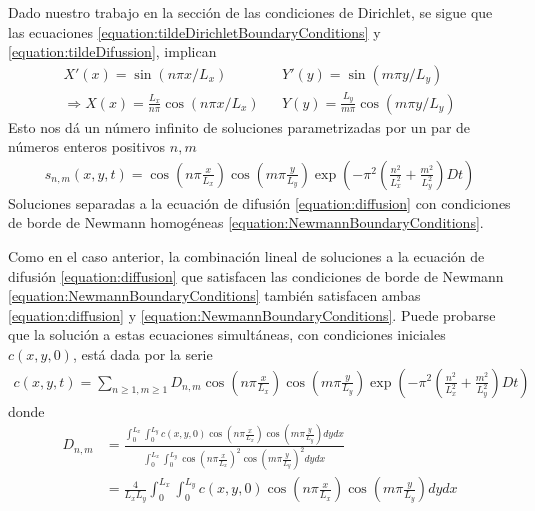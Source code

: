 \documentclass{article}
\begin{document}
  Dado nuestro trabajo en la sección de las condiciones de Dirichlet, se sigue que las ecuaciones \eqref{equation:tildeDirichletBoundaryConditions} y \eqref{equation:tildeDifussion}, implican
  \begin{align}
    X'(x) = \sin(n \pi x / L_x)
    &&Y'(y) = \sin(m \pi y / L_y)
    \\
    \Rightarrow
    X(x) = \frac{L_x}{n \pi} \cos(n \pi x / L_x)
    && Y(y) = \frac{L_y}{m \pi} \cos(m \pi y / L_y)
  \end{align}
  Esto nos dá un número infinito de soluciones parametrizadas por un par de números enteros positivos \(n, m\)
  \begin{align}
    s_{n, m}(x, y, t)
    =
    \cos\left( n \pi \frac{x}{L_x} \right) \cos\left(m \pi \frac{y}{L_y} \right) \exp\left( - \pi^2 \left( \frac{n^2}{L_x^2} + \frac{m^2}{L_y^2} \right) D t \right)
  \end{align}
  Soluciones separadas a la ecuación de difusión \eqref{equation:diffusion} con condiciones de borde de Newmann homogéneas \eqref{equation:NewmannBoundaryConditions}.


  Como en el caso anterior, la combinación lineal de soluciones a la ecuación de difusión \eqref{equation:diffusion} que satisfacen las condiciones de borde de Newmann \eqref{equation:NewmannBoundaryConditions} también satisfacen ambas \eqref{equation:diffusion} y \eqref{equation:NewmannBoundaryConditions}.
  Puede probarse que la solución a estas ecuaciones simultáneas, con condiciones iniciales \(c(x, y, 0)\), está dada por la serie
  \begin{align}
    c(x, y, t)
    =
    \sum_{n \geq 1, m \geq 1}
      D_{n, m}
      \cos\left( n \pi \frac{x}{L_x} \right)
      \cos\left( m \pi \frac{y}{L_y} \right)
      \exp\left(
        - \pi^2 \left(
          \frac{n^2}{L_x^2} + \frac{m^2}{L_y^2}
        \right)
        D t
      \right)
  \end{align}
  donde
  \begin{align}
    D_{n, m}
    &=
    \frac{
      \int_0^{L_x}
        \int_0^{L_y}
          c(x, y, 0)
          \cos\left( n \pi \frac{x}{L_x} \right)
          \cos\left( m \pi \frac{y}{L_y} \right)
        d y
      d x
    }{
      \int_0^{L_x}
        \int_0^{L_y}
        \cos\left( n \pi \frac{x}{L_x} \right)^2
        \cos\left( m \pi \frac{y}{L_y} \right)^2
        d y
      d x
    }
    \\
    &=
    \frac{4}{L_x L_y} 
    \int_0^{L_x}
      \int_0^{L_y}
        c(x, y, 0)
        \cos\left( n \pi \frac{x}{L_x} \right)
        \cos\left( m \pi \frac{y}{L_y} \right)
      d y
    d x
  \end{align}
\end{document}
